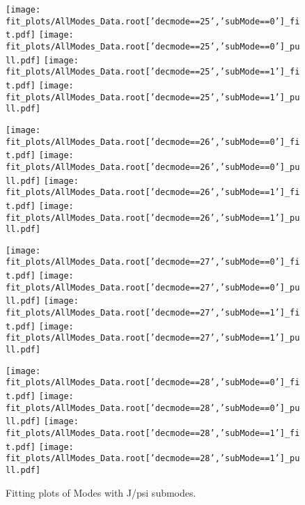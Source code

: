 \begin{figure}[h!]
\begin{center}
\texttt{[image: fit\_plots/AllModes\_Data.root['decmode==25','subMode==0']\_fit.pdf]}
\texttt{[image: fit\_plots/AllModes\_Data.root['decmode==25','subMode==0']\_pull.pdf]}
\texttt{[image: fit\_plots/AllModes\_Data.root['decmode==25','subMode==1']\_fit.pdf]}
\texttt{[image: fit\_plots/AllModes\_Data.root['decmode==25','subMode==1']\_pull.pdf]}

\texttt{[image: fit\_plots/AllModes\_Data.root['decmode==26','subMode==0']\_fit.pdf]}
\texttt{[image: fit\_plots/AllModes\_Data.root['decmode==26','subMode==0']\_pull.pdf]}
\texttt{[image: fit\_plots/AllModes\_Data.root['decmode==26','subMode==1']\_fit.pdf]}
\texttt{[image: fit\_plots/AllModes\_Data.root['decmode==26','subMode==1']\_pull.pdf]}

\texttt{[image: fit\_plots/AllModes\_Data.root['decmode==27','subMode==0']\_fit.pdf]}
\texttt{[image: fit\_plots/AllModes\_Data.root['decmode==27','subMode==0']\_pull.pdf]}
\texttt{[image: fit\_plots/AllModes\_Data.root['decmode==27','subMode==1']\_fit.pdf]}
\texttt{[image: fit\_plots/AllModes\_Data.root['decmode==27','subMode==1']\_pull.pdf]}

\texttt{[image: fit\_plots/AllModes\_Data.root['decmode==28','subMode==0']\_fit.pdf]}
\texttt{[image: fit\_plots/AllModes\_Data.root['decmode==28','subMode==0']\_pull.pdf]}
\texttt{[image: fit\_plots/AllModes\_Data.root['decmode==28','subMode==1']\_fit.pdf]}
\texttt{[image: fit\_plots/AllModes\_Data.root['decmode==28','subMode==1']\_pull.pdf]}
\caption{Fitting plots of Modes with J/psi submodes.}
\label{fig:passMode03}
\end{center}
\end{figure}

